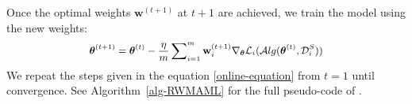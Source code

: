 Once the optimal weights $\mathbf{w}^{(t+1)}$ at $t+1$ are achieved, we train the model using the new weights:
\begin{equation}
\small
    \begin{aligned}
        \boldsymbol{\theta}^{(t+1)} = \boldsymbol{\theta}^{(t)} - \frac{\eta}{m}\sum\nolimits_{i=1}^{m} \mathbf{w}_{i}^{(t+1)}\nabla_{\boldsymbol{\theta}}\mathcal{L}_i(\mathcal{A}lg(\boldsymbol{\theta}^{(t)}, \mathcal{D}_i^{S}))
\end{aligned}
    \label{model-update}
\end{equation}
We repeat the steps given in the equation \eqref{online-equation} from $t=1$ until convergence. See Algorithm~\ref{alg-RWMAML} for the full pseudo-code of \sysname.

